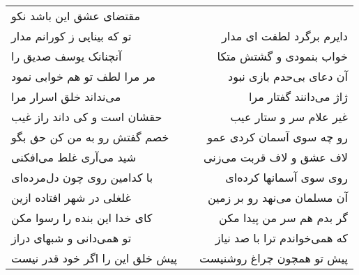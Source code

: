 \begin{center}
\begin{longtable}{l p{0.5cm} r}
مقتضای عشق این باشد نکو
\\
تو که بینایی ز کورانم مدار
&&
دایرم برگرد لطفت ای مدار
\\
آنچنانک یوسف صدیق را
&&
خواب بنمودی و گشتش متکا
\\
مر مرا لطف تو هم خوابی نمود
&&
آن دعای بی‌حدم بازی نبود
\\
می‌نداند خلق اسرار مرا
&&
ژاژ می‌دانند گفتار مرا
\\
حقشان است و کی داند راز غیب
&&
غیر علام سر و ستار عیب
\\
خصم گفتش رو به من کن حق بگو
&&
رو چه سوی آسمان کردی عمو
\\
شید می‌آری غلط می‌افکنی
&&
لاف عشق و لاف قربت می‌زنی
\\
با کدامین روی چون دل‌مرده‌ای
&&
روی سوی آسمانها کرده‌ای
\\
غلغلی در شهر افتاده ازین
&&
آن مسلمان می‌نهد رو بر زمین
\\
کای خدا این بنده را رسوا مکن
&&
گر بدم هم سر من پیدا مکن
\\
تو همی‌دانی و شبهای دراز
&&
که همی‌خواندم ترا با صد نیاز
\\
پیش خلق این را اگر خود قدر نیست
&&
پیش تو همچون چراغ روشنیست
\\
\end{longtable}
\end{center}
